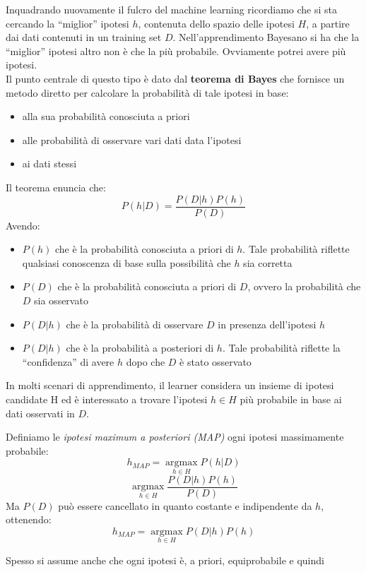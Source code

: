 \documentclass[a4paper,12pt, oneside]{book}
\begin{document}
Inquadrando nuovamente il fulcro del machine learning ricordiamo che si sta
cercando la ``miglior'' ipotesi $h$, contenuta dello spazio delle ipotesi $H$, a
partire dai dati contenuti in un training set $D$. Nell'apprendimento Bayesano
si ha che la ``miglior'' ipotesi altro non è che la più probabile. Ovviamente
potrei avere più ipotesi.\\
Il punto centrale di questo tipo è dato dal \textbf{teorema di Bayes} che
fornisce un metodo diretto per calcolare la probabilità di tale ipotesi in base:
\begin{itemize}
  \item alla sua probabilità conosciuta a priori
  \item alle probabilità di osservare vari dati data l'ipotesi
  \item ai dati stessi
\end{itemize}
\begin{teorema}
  Il teorema enuncia che:
  \[P(h|D)=\frac{P(D|h)P(h)}{P(D)}\]
  Avendo:
  \begin{itemize}
    \item $P(h)$ che è la probabilità conosciuta a priori di $h$. Tale
    probabilità riflette qualsiasi conoscenza di base sulla possibilità
    che $h$ sia corretta  
    \item $P(D)$ che è la probabilità conosciuta a priori di $D$, ovvero la
    probabilità che $D$ sia osservato
    \item $P(D|h)$ che è la probabilità di osservare $D$ in presenza
    dell'ipotesi $h$
    \item $P(D|h)$ che è la probabilità a posteriori di $h$. Tale probabilità
    riflette la ``confidenza'' di avere $h$  dopo che $D$ è stato osservato
  \end{itemize}
\end{teorema}
In molti scenari di apprendimento, il learner considera un insieme di ipotesi
candidate H ed è interessato a trovare l'ipotesi $h\in H$ più probabile in base
ai dati osservati in $D$.
\begin{definizione}
  Definiamo le \textit{ipotesi maximum a posteriori (MAP)} ogni ipotesi
  massimamente probabile:
  \[h_{MAP}=\operatorname*{argmax}_{h\in H}P(h|D)\]
  \[\operatorname*{argmax}_{h\in H}\frac{P(D|h)P(h)}{P(D)}\]
  Ma $P(D)$ può essere cancellato in quanto costante e indipendente da $h$,
  ottenendo:
  \[h_{MAP}=\operatorname*{argmax}_{h\in H}P(D|h)P(h)\]
\end{definizione}
Spesso si assume anche che ogni ipotesi è, a priori, equiprobabile e quindi
\end{document}
